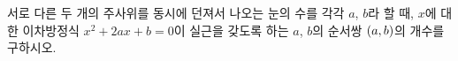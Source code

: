 서로 다른 두 개의 주사위를 동시에 던져서 나오는 눈의 수를 각각 $a$, $b$라 할 때, $x$에 대한 이차방정식 $x^2+2ax+b=0$이 실근을 갖도록 하는 $a$, $b$의 순서쌍 $(a{,}\mkern3mu\mathopen{}b)$의 개수를 구하시오.
